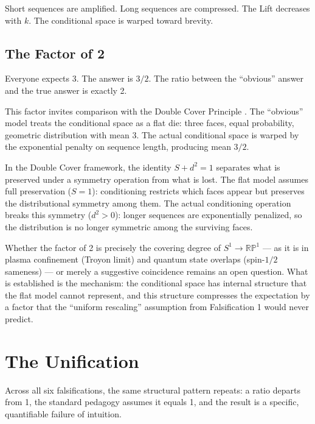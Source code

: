 \documentclass[12pt]{article}
\begin{document}
Short sequences are amplified. Long sequences are compressed. The Lift decreases with $k$. The conditional space is warped toward brevity.

\subsection{The Factor of 2}

Everyone expects 3. The answer is $3/2$. The ratio between the ``obvious'' answer and the true answer is exactly 2.

This factor invites comparison with the Double Cover Principle \cite{davis2026doublecover}. The ``obvious'' model treats the conditional space as a flat die: three faces, equal probability, geometric distribution with mean 3. The actual conditional space is warped by the exponential penalty on sequence length, producing mean $3/2$.

In the Double Cover framework, the identity $S + d^2 = 1$ separates what is preserved under a symmetry operation from what is lost. The flat model assumes full preservation ($S = 1$): conditioning restricts which faces appear but preserves the distributional symmetry among them. The actual conditioning operation breaks this symmetry ($d^2 > 0$): longer sequences are exponentially penalized, so the distribution is no longer symmetric among the surviving faces.

Whether the factor of 2 is precisely the covering degree of $S^1 \to \mathbb{RP}^1$ --- as it is in plasma confinement (Troyon limit) and quantum state overlaps (spin-$1/2$ sameness) --- or merely a suggestive coincidence remains an open question. What is established is the mechanism: the conditional space has internal structure that the flat model cannot represent, and this structure compresses the expectation by a factor that the ``uniform rescaling'' assumption from Falsification 1 would never predict.

\section{The Unification}

Across all six falsifications, the same structural pattern repeats: a ratio departs from 1, the standard pedagogy assumes it equals 1, and the result is a specific, quantifiable failure of intuition.
\end{document}
